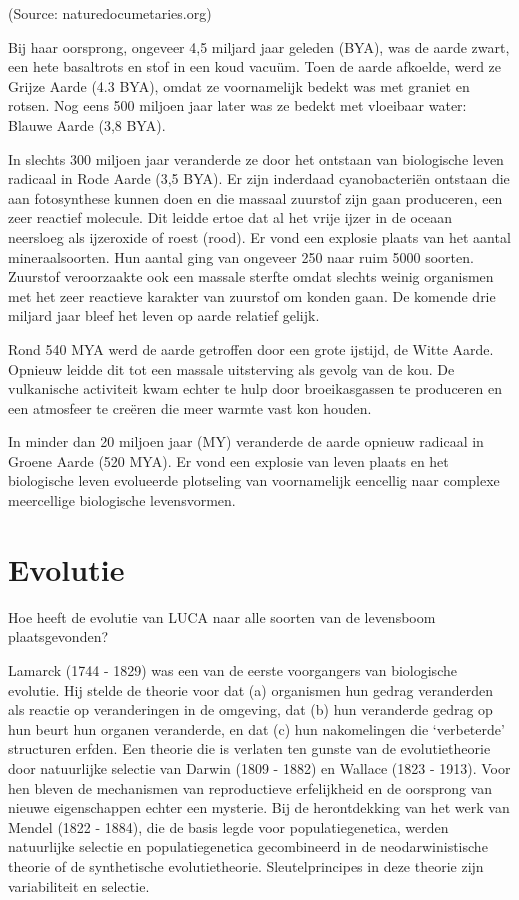 \documentclass[
  11pt,
]{book}
\begin{document}
(Source: naturedocumetaries.org)

Bij haar oorsprong, ongeveer 4,5 miljard jaar geleden (BYA), was de aarde zwart, een hete basaltrots en stof in een koud vacuüm. Toen de aarde afkoelde, werd ze Grijze Aarde (4.3 BYA), omdat ze voornamelijk bedekt was met graniet en rotsen. Nog eens 500 miljoen jaar later was ze bedekt met vloeibaar water: Blauwe Aarde (3,8 BYA).

In slechts 300 miljoen jaar veranderde ze door het ontstaan van biologische leven radicaal in Rode Aarde (3,5 BYA). Er zijn inderdaad cyanobacteriën ontstaan die aan fotosynthese kunnen doen en die massaal zuurstof zijn gaan produceren, een zeer reactief molecule. Dit leidde ertoe dat al het vrije ijzer in de oceaan neersloeg als ijzeroxide of roest (rood). Er vond een explosie plaats van het aantal mineraalsoorten. Hun aantal ging van ongeveer 250 naar ruim 5000 soorten. Zuurstof veroorzaakte ook een massale sterfte omdat slechts weinig organismen met het zeer reactieve karakter van zuurstof om konden gaan. De komende drie miljard jaar bleef het leven op aarde relatief gelijk.

Rond 540 MYA werd de aarde getroffen door een grote ijstijd, de Witte Aarde. Opnieuw leidde dit tot een massale uitsterving als gevolg van de kou. De vulkanische activiteit kwam echter te hulp door broeikasgassen te produceren en een atmosfeer te creëren die meer warmte vast kon houden.

In minder dan 20 miljoen jaar (MY) veranderde de aarde opnieuw radicaal in Groene Aarde (520 MYA). Er vond een explosie van leven plaats en het biologische leven evolueerde plotseling van voornamelijk eencellig naar complexe meercellige biologische levensvormen.

\hypertarget{evolutie}{%
\section{Evolutie}\label{evolutie}}

Hoe heeft de evolutie van LUCA naar alle soorten van de levensboom plaatsgevonden?

Lamarck (1744 - 1829) was een van de eerste voorgangers van biologische evolutie. Hij stelde de theorie voor dat (a) organismen hun gedrag veranderden als reactie op veranderingen in de omgeving, dat (b) hun veranderde gedrag op hun beurt hun organen veranderde, en dat (c) hun nakomelingen die `verbeterde' structuren erfden. Een theorie die is verlaten ten gunste van de evolutietheorie door natuurlijke selectie van Darwin (1809 - 1882) en Wallace (1823 - 1913). Voor hen bleven de mechanismen van reproductieve erfelijkheid en de oorsprong van nieuwe eigenschappen echter een mysterie. Bij de herontdekking van het werk van Mendel (1822 - 1884), die de basis legde voor populatiegenetica, werden natuurlijke selectie en populatiegenetica gecombineerd in de neodarwinistische theorie of de synthetische evolutietheorie. Sleutelprincipes in deze theorie zijn variabiliteit en selectie.
\end{document}
